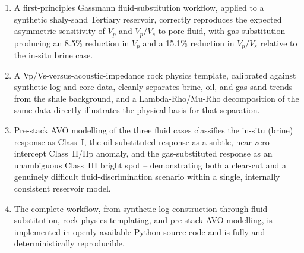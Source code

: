 \documentclass[11pt]{article}
\begin{document}
\begin{enumerate}[label=(\arabic*)]
\item A first-principles Gassmann fluid-substitution workflow, applied to a synthetic shaly-sand Tertiary reservoir, correctly reproduces the expected asymmetric sensitivity of \(V_p\) and \(V_p/V_s\) to pore fluid, with gas substitution producing an 8.5\% reduction in \(V_p\) and a 15.1\% reduction in \(V_p/V_s\) relative to the in-situ brine case.
\item A Vp/Vs-versus-acoustic-impedance rock physics template, calibrated against synthetic log and core data, cleanly separates brine, oil, and gas sand trends from the shale background, and a Lambda-Rho/Mu-Rho decomposition of the same data directly illustrates the physical basis for that separation.
\item Pre-stack AVO modelling of the three fluid cases classifies the in-situ (brine) response as Class~I, the oil-substituted response as a subtle, near-zero-intercept Class~II/IIp anomaly, and the gas-substituted response as an unambiguous Class~III bright spot -- demonstrating both a clear-cut and a genuinely difficult fluid-discrimination scenario within a single, internally consistent reservoir model.
\item The complete workflow, from synthetic log construction through fluid substitution, rock-physics templating, and pre-stack AVO modelling, is implemented in openly available Python source code and is fully and deterministically reproducible.
\end{enumerate}
\end{document}
